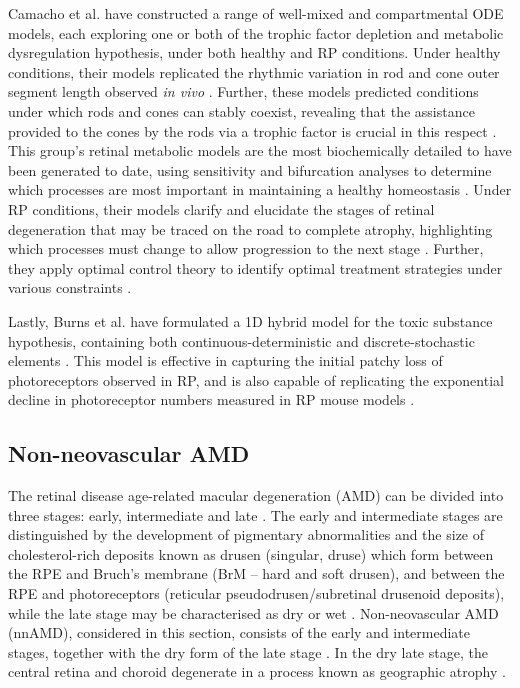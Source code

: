 \documentclass{article}
\begin{document}
Camacho et al. have constructed a range of well-mixed and compartmental ODE models, each exploring one or both of the trophic factor depletion and metabolic dysregulation hypothesis, under both healthy and RP conditions. Under healthy conditions, their models replicated the rhythmic variation in rod and cone outer segment length observed \emph{in vivo} \citep{Camacho_et_al_2010,Camacho_et_al_2016b,Colon_Velez_et_al_2003, Wifvat_et_al_2021}. Further, these models predicted conditions under which rods and cones can stably coexist, revealing that the assistance provided to the cones by the rods via a trophic factor is crucial in this respect \citep{Camacho_et_al_2010,Camacho_et_al_2016b,Colon_Velez_et_al_2003, Wifvat_et_al_2021}. This group’s retinal metabolic models are the most biochemically detailed to have been generated to date, using sensitivity and bifurcation analyses to determine which processes are most important in maintaining a healthy homeostasis \citep{Aparicio_et_al_2022,Dobreva_et_al_2022,Camacho_et_al_2019,Camacho_et_al_2021a}. Under RP conditions, their models clarify and elucidate the stages of retinal degeneration that may be traced on the road to complete atrophy, highlighting which processes must change to allow progression to the next stage \citep{Camacho_and_Wirkus_2013,Camacho_et_al_2016,Camacho_et_al_2016c}. Further, they apply optimal control theory to identify optimal treatment strategies under various constraints \citep{Camacho_et_al_2014,Camacho_et_al_2020}.

Lastly, Burns et al. have formulated a 1D hybrid model for the toxic substance hypothesis, containing both continuous-deterministic and discrete-stochastic elements \citep{Burns_et_al_2002}. This model is effective in capturing the initial patchy loss of photoreceptors observed in RP, and is also capable of replicating the exponential decline in photoreceptor numbers measured in RP mouse models \citep{Clarke_et_al_2000}.
%
\subsection{Non-neovascular AMD}\label{Sec_nnAMD}
%
The retinal disease age-related macular degeneration (AMD) can be divided into three stages: early, intermediate and late \citep{Ferris_et_al_2013}. The early and intermediate stages are distinguished by the development of pigmentary abnormalities and the size of cholesterol-rich deposits known as drusen (singular, druse) which form between the RPE and Bruch’s membrane (BrM – hard and soft drusen), and between the RPE and photoreceptors (reticular pseudodrusen/subretinal drusenoid deposits), while the late stage may be characterised as dry or wet \citep{Coleman_et_al_2008,Ferris_et_al_2013,Jager_2008,Wu_et_al_2022}. Non-neovascular AMD (nnAMD), considered in this section, consists of the early and intermediate stages, together with the dry form of the late stage \citep[][see \textcolor{red}{Section~\ref{sec:RetinalHaemodynamicsNAMDDR}} on neovascular AMD]{Ferris_et_al_2013}. In the dry late stage, the central retina and choroid degenerate in a process known as geographic atrophy \citep[GA,][]{Coleman_et_al_2008,Jager_2008,Ly_et_al_2016}.
\end{document}
